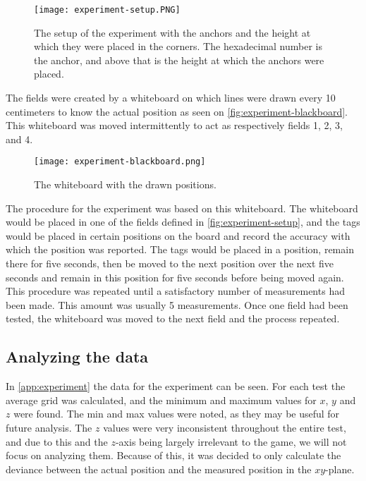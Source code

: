 \begin{figure}[H]
    \centering
    \texttt{[image: experiment-setup.PNG]}
    \caption{The setup of the experiment with the anchors and the height at which they were placed in the corners. The hexadecimal number is the anchor, and above that is the height at which the anchors were placed.}
    \label{fig:experiment-setup}
\end{figure}
\noindent
The fields were created by a whiteboard on which lines were drawn every 10 centimeters to know the actual position as seen on \autoref{fig:experiment-blackboard}.
This whiteboard was moved intermittently to act as respectively fields 1, 2, 3, and 4.

\begin{figure}[H]
    \centering
    \texttt{[image: experiment-blackboard.png]}
    \caption{The whiteboard with the drawn positions.}
    \label{fig:experiment-blackboard}
\end{figure}
\noindent
The procedure for the experiment was based on this whiteboard.
The whiteboard would be placed in one of the fields defined in \autoref{fig:experiment-setup}, and the tags would be placed in certain positions on the board and record the accuracy with which the position was reported.
The tags would be placed in a position, remain there for five seconds, then be moved to the next position over the next five seconds and remain in this position for five seconds before being moved again.
This procedure was repeated until a satisfactory number of measurements had been made.
This amount was usually 5 measurements.
Once one field had been tested, the whiteboard was moved to the next field and the process repeated.

\subsection{Analyzing the data}
In \autoref{app:experiment} the data for the experiment can be seen.
For each test the average grid was calculated, and the minimum and maximum values for $x$, $y$ and $z$ were found.
The min and max values were noted, as they may be useful for future analysis.
The $z$ values were very inconsistent throughout the entire test, and due to this and the $z$-axis being largely irrelevant to the game, we will not focus on analyzing them.
Because of this, it was decided to only calculate the deviance between the actual position and the measured position in the $xy$-plane.

